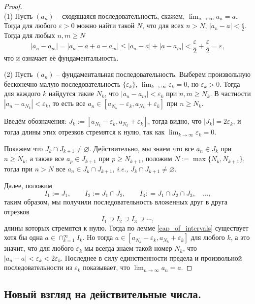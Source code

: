 \begin{proof}~\\
(1) Пусть $(a_n)$ -- сходящаяся последовательность, скажем, $\lim_{n \to \infty}a_n = a$. Тогда для любого $\varepsilon>0$ можно найти такой $N$, что для всех $n>N$, $|a_n - a| < \frac{\varepsilon}{2}$. Тогда для любых $n,m \ge N$
    \[
     |a_n - a_m| = |a_n - a + a - a_m| \le |a_n - a| + |a - a_m| < \frac{\varepsilon}{2} + \frac{\varepsilon}{2} =\varepsilon,
    \]
    что и означает её фундаментальность.

(2) Пусть $(a_n)$ -- фундаментальная последовательность. Выберем произвольную бесконечно малую последовательность $\{\varepsilon_k\}$, \ie $\lim_{k \to \infty} \varepsilon_k = 0$, но $\varepsilon_k >0$. Тогда для каждого $k$ найдутся такие $N_k$, что $|a_n - a_m| < \varepsilon_k$ при $n,m \ge N_k$. В частности $|a_n - a_{N_k}|<\varepsilon_k$, то есть все $a_n \in [a_{N_k}-\varepsilon_k, a_{N_k}+\varepsilon_k]$ при $n\ge N_k$.

Введём обозначения: $J_k:=[a_{N_k}-\varepsilon_k, a_{N_k}+\varepsilon_k]$, тогда видно, что $|J_k| = 2\varepsilon_k$, и тогда длины этих отрезков стремятся к нулю, так как $\lim_{k \to \infty} \varepsilon_k = 0$.

Покажем что $J_k \cap J_{k+1} \ne \varnothing$. Действительно, мы знаем что все $a_n \in J_k$ при $n\ge N_k$, а также все $a_p \in J_{k+1}$ при $p \ge N_{k+1}$, положим $N:=\max\{N_k,N_{k+1}\}$, тогда при $n>N$ все $a_n \in J_k \cap J_{k+1}$, \textit{i.e.,}  $J_k \cap J_{k+1} \ne \varnothing$.

Далее, положим
\[
 I_1:=J_1, \qquad I_2:=J_1 \cap J_2, \qquad I_3: = J_1 \cap J_2 \cap J_3,\quad  \ldots,
\]
таким образом, мы получили последовательность вложенных друг в друга отрезков
\[
I_1 \supseteq I_2 \supseteq I_3 \supseteq \cdots,
\]
длины которых стремятся к нулю. Тогда по лемме \ref{cap_of_intervals} существует хотя бы одна $a \in \cap_{k=1}^\infty I_k$. Но тогда $a \in [a_{N_k}-\varepsilon_k, a_{N_k}+\varepsilon_k]$ для любого $k$, а это значит, что для любого $\varepsilon_k$ мы всегда знаем такой номер $N_k$, что $|a_n - a|<\varepsilon_k<2 \varepsilon_k$. Последнее в силу единственности предела и произвольной последовательности из $\varepsilon_k$ показывает, что $\lim_{n\to \infty}a_n = a$.
\end{proof}

\subsection{Новый взгляд на действительные числа.}\label{barQ=R}

